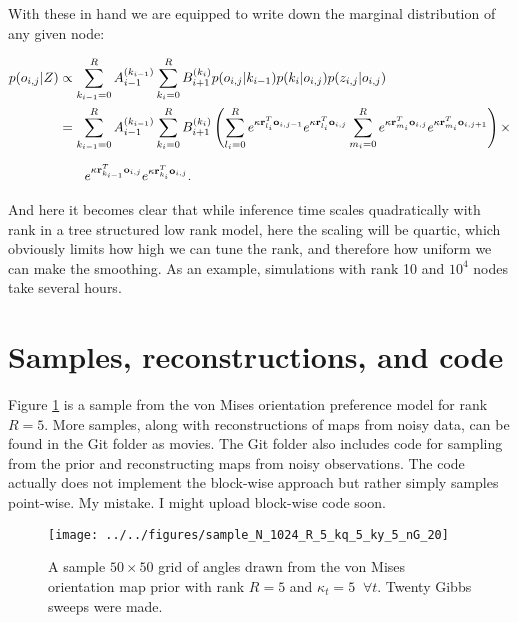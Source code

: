 \documentclass[11pt]{article}
\begin{document}
\noindent With these in hand we are equipped to write down the marginal distribution of any given node:

\begin{align}
p(o_{i,j}|Z) &\propto \sum_{k_{i-1}=0}^R A_{i-1}^{(k_{i-1})} \sum_{k_i=0}^R B_{i+1}^{(k_{i})} p(o_{i,j}|k_{i-1}) p(k_i|o_{i,j}) p(z_{i,j}|o_{i,j}) \notag \\
&= \sum_{k_{i-1}=0}^R A_{i-1}^{(k_{i-1})} \sum_{k_i=0}^R B_{i+1}^{(k_{i})} \left( \sum_{l_i=0}^R e^{\kappa\mathbf{r}_{l_i}^T\mathbf{o}_{i,j-1}} e^{\kappa\mathbf{r}_{l_i}^T\mathbf{o}_{i,j}} \sum_{m_i=0}^R e^{\kappa\mathbf{r}_{m_i}^T\mathbf{o}_{i,j}} e^{\kappa\mathbf{r}_{m_i}^T\mathbf{o}_{i,j+1}}\right) \times \\[2mm]
&\;\;\;\;\;\;\;e^{\kappa \mathbf{r}_{k_{i-1}}^T \mathbf{o}_{i,j}} e^{\kappa \mathbf{r}_{k_i}^T \mathbf{o}_{i,j}}. \notag
\end{align}

\noindent And here it becomes clear that while inference time scales quadratically with rank in a tree structured low rank model, here the scaling will be quartic, which obviously limits how high we can tune the rank, and therefore how uniform we can make the smoothing. As an example, simulations with rank 10 and $10^4$ nodes take several hours.

\section{Samples, reconstructions, and code}
\label{sec:samples_and_reconstructions}

Figure \ref{fig:sample_1} is a sample from the von Mises orientation preference model for rank $R=5$. More samples, along with reconstructions of maps from noisy data, can be found in the Git folder as movies. The Git folder also includes code for sampling from the prior and reconstructing maps from noisy observations. The code actually does not implement the block-wise approach but rather simply samples point-wise. My mistake. I might upload block-wise code soon.

\begin{figure}[h]
\centering
\texttt{[image: ../../figures/sample\_N\_1024\_R\_5\_kq\_5\_ky\_5\_nG\_20]}
\caption{A sample $50\times50$ grid of angles drawn from the von Mises orientation map prior with rank $R=5$ and $\kappa_t=5\;\;\forall t$. Twenty Gibbs sweeps were made.}
\label{fig:sample_1}
\end{figure}



\end{document}
